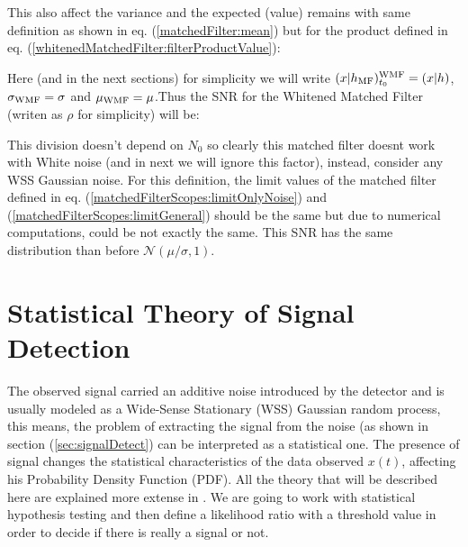 
\newp This also affect the variance and the expected (value) remains with same definition as shown in eq. (\ref{matchedFilter:mean}) but for the product defined in eq. (\ref{whitenedMatchedFilter:filterProductValue}):



\newp Here (and in the next sections) for simplicity we will write $(x|h_{\text{MF}})^{\text{WMF}}_{t_0} = (x|h)$, $\sigma_{\text{WMF}} = \sigma$ and $\mu_{\text{WMF}} = \mu$.Thus the SNR for the Whitened Matched Filter (writen as $\rho$ for simplicity) will be:


\newp This division doesn't depend on $N_0$ so clearly this matched filter doesnt work with White noise (and in next we will ignore this factor), instead, consider any WSS Gaussian noise. For this definition, the limit values of the matched filter defined in eq. (\ref{matchedFilterScopes:limitOnlyNoise}) and (\ref{matchedFilterScopes:limitGeneral}) should be the same but due to numerical computations, could be not exactly the same. This SNR has the same distribution than before $\mathcal{N}(\mu / \sigma, 1)$.

\section{Statistical Theory of Signal Detection}{\label{statTheoSigDet}}
\newp The observed signal carried an additive noise introduced by the detector and is usually modeled as a Wide-Sense Stationary (WSS) Gaussian random process, this means, the problem of extracting the signal from the noise (as shown in section (\ref{sec:signalDetect}) can be interpreted as a statistical one. The presence of signal changes the statistical characteristics of the data observed $x(t)$, affecting his Probability Density Function (PDF). 
\newp All the theory that will be described here are explained more extense in \citep{ligo-gauss-case, mit-course-sigSysAndInfer, ligo-1992}.
\newp We are going to work with statistical hypothesis testing and then define a likelihood ratio with a threshold value in order to decide if there is really a signal or not.

